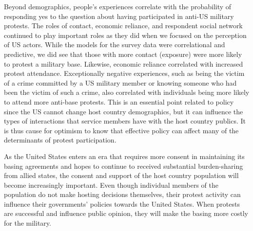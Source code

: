 			
			Beyond demographics, people's experiences correlate with the probability of responding yes to the question about having participated in anti-US military protests. The roles of contact, economic reliance, and respondent social network continued to play important roles as they did when we focused on the perception of US actors. While the models for the survey data were correlational and predictive, we did see that those with more contact (exposure) were more likely to protest a military base. Likewise, economic reliance correlated with increased protest attendance. Exceptionally negative experiences, such as being the victim of a crime committed by a US military member or knowing someone who had been the victim of such a crime, also correlated with individuals being more likely to attend more anti-base protests. This is an essential point related to policy since the US cannot change host country demographics, but it can influence the types of interactions that service members have with the host country publics. It is thus cause for optimism to know that effective policy can affect many of the determinants of protest participation.
			
			As the United States enters an era that requires more consent in maintaining its basing agreements and hopes to continue to received substantial burden-sharing from allied states, the consent and support of the host country population will become increasingly important. Even though individual members of the population do not make hosting decisions themselves, their protest activity can influence their governments' policies towards the United States. When protests are successful and influence public opinion, they will make the basing more costly for the military. 
			
			
			
			
			
			
			\begin{comment}
			
			
			
			
			
			
			
			
			\end{comment}
			
			
